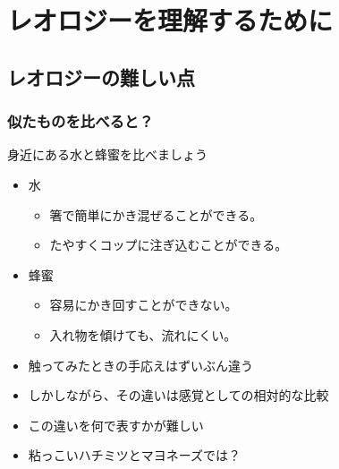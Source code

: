 \documentclass[12pt, dvipdfmx]{beamer}
\begin{document}
\section{レオロジーを理解するために}
\subsection{レオロジーの難しい点}
\begin{frame}
	\frametitle{似たものを比べると？}
	\begin{block}{身近にある水と蜂蜜を比べましょう}
		\begin{itemize}
			\item 水
				\begin{itemize}
					\item 箸で簡単にかき混ぜることができる。
					\item たやすくコップに注ぎ込むことができる。
				\end{itemize}
			\item 蜂蜜
				\begin{itemize}
					\item 容易にかき回すことができない。
					\item 入れ物を傾けても、流れにくい。
				\end{itemize}
		\end{itemize}
	\end{block}
	\begin{itemize}
		\item 触ってみたときの手応えはずいぶん違う
		\item しかしながら、その違いは感覚としての相対的な比較
		\item この違いを何で表すかが難しい
		\item 粘っこいハチミツとマヨネーズでは？
	\end{itemize}
\end{frame}
\end{document}
